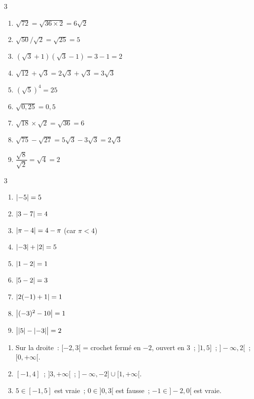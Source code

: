 
\begin{multicols}{3}
\begin{enumerate}
  \item $\sqrt{72}=\sqrt{36\times2}=6\sqrt{2}$
  \item $\sqrt{50}/\sqrt{2}=\sqrt{25}=5$
  \item $(\sqrt{3}+1)(\sqrt{3}-1)=3-1=2$
  \item $\sqrt{12}+\sqrt{3}=2\sqrt{3}+\sqrt{3}=3\sqrt{3}$
  \item $(\sqrt{5})^4=25$
  \item $\sqrt{0{,}25}=0{,}5$
  \item $\sqrt{18}\times\sqrt{2}=\sqrt{36}=6$
  \item $\sqrt{75}-\sqrt{27}=5\sqrt{3}-3\sqrt{3}=2\sqrt{3}$
  \item $\dfrac{\sqrt{8}}{\sqrt{2}}=\sqrt{4}=2$
\end{enumerate}
\end{multicols}


\begin{multicols}{3}
\begin{enumerate}
  \item $\left|-5\right|=5$
  \item $\left|3-7\right|=4$
  \item $\left|\pi-4\right|=4-\pi$ (car $\pi<4$)
  \item $\left|-3\right|+\left|2\right|=5$
  \item $\left|1-2\right|=1$
  \item $\left|5-2\right|=3$
  \item $\left|2(-1)+1\right|=1$
  \item $\left|(-3)^2-10\right|=1$
  \item $\bigl|\left|5\right|-\left|-3\right|\bigr|=2$
\end{enumerate}
\end{multicols}


\begin{enumerate}
  \item Sur la droite~: $[-2,3[$ = crochet ferm\'e en $-2$, ouvert en $3$~; $]1,5]$~; $]-\infty,2[$~; $[0,+\infty[$.
  \item $[-1,4]$~; $]3,+\infty[$~; $]-\infty,-2]\cup[1,+\infty[$.
  \item $5\in[-1,5]$ est vraie~; $0\in]0,3[$ est fausse~;
        $-1\in]-2,0[$ est vraie.
\end{enumerate}

